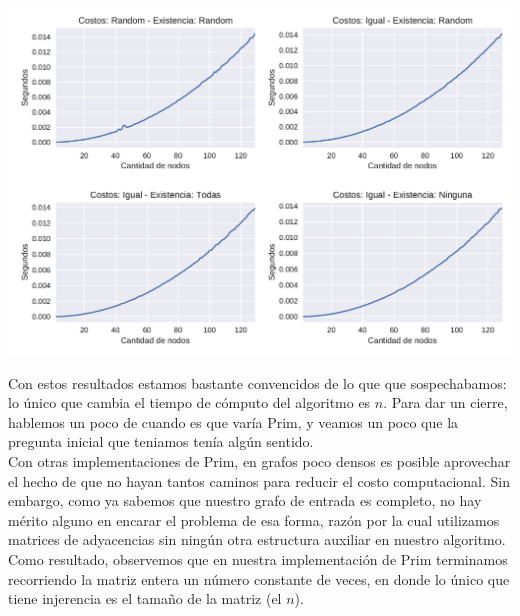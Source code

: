 {\centering
  \includegraphics[width=1\textwidth]{imagenes/problema3/todos.pdf} \\
}

Con estos resultados estamos bastante convencidos de lo que que sospechabamos: lo único que cambia el tiempo de cómputo del algoritmo es $n$. Para dar un cierre, hablemos un poco de cuando es que varía Prim, y veamos un poco que la pregunta inicial que teniamos tenía algún sentido. \\

Con otras implementaciones de Prim, en grafos poco densos es posible aprovechar el hecho de que no hayan tantos caminos para reducir el costo computacional. Sin embargo, como ya sabemos que nuestro grafo de entrada es completo, no hay mérito alguno en encarar el problema de esa forma, razón por la cual utilizamos matrices de adyacencias sin ningún otra estructura auxiliar en nuestro algoritmo. Como resultado, observemos que en nuestra implementación de Prim terminamos recorriendo la matriz entera un número constante de veces, en donde lo único que tiene injerencia es el tamaño de la matriz (el $n$).